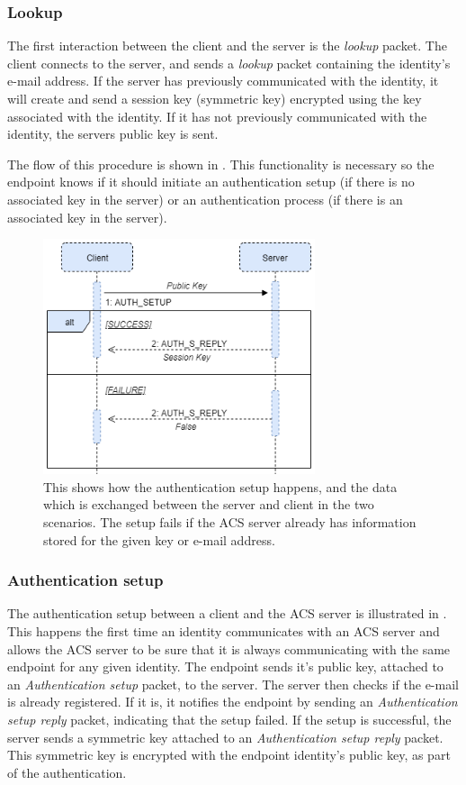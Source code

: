 	\subsubsection*{Lookup}
	The first interaction between the client and the server is the \emph{lookup} packet. The client connects to the server, and sends a \emph{lookup} packet containing the identity's e-mail address. If the server has previously communicated with the identity, it will create and send a session key (symmetric key) encrypted using the key associated with the identity. If it has not previously communicated with the identity, the servers public key is sent.

	The flow of this procedure is shown in . This functionality is necessary so the endpoint knows if it should initiate an authentication setup (if there is no associated key in the server) or an authentication process (if there is an associated key in the server).

	\begin{figure}[th]
	  \centering
	  \includegraphics[width=80mm]{Figures/ACS_Prot/Auth_Setup}
	  \decoRule
	  \caption[ACS protocol: Authentication setup]{This shows how the authentication setup happens, and the data which is exchanged between the server and client in the two scenarios. The setup fails if the ACS server already has information stored for the given key or e-mail address.}
	  \label{fig:prot_setup}
	\end{figure}	

	\subsubsection*{Authentication setup}
	The authentication setup between a client and the ACS server is illustrated in . This happens the first time an identity communicates with an ACS server and allows the ACS server to be sure that it is always communicating with the same endpoint for any given identity. The endpoint sends it's public key, attached to an \emph{Authentication setup} packet, to the server. The server then checks if the e-mail is already registered. If it is, it notifies the endpoint by sending an \emph{Authentication setup reply} packet, indicating that the setup failed. If the setup is successful, the server sends a symmetric key attached to an \emph{Authentication setup reply} packet. This symmetric key is encrypted with the endpoint identity's public key, as part of the authentication. 

